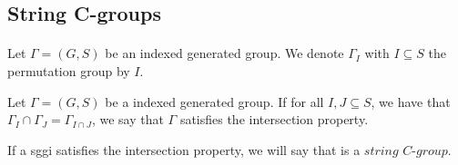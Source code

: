 \subsection{String C-groups}

\paragraph{}
Let $\Gamma = (G,S)$ be an indexed generated group. We denote $\Gamma_I$ with $I \subseteq S$ the permutation group by $I$.

\begin{definition}
  Let $\Gamma = (G,S)$ be a indexed generated group. If for all $I, J \subseteq S$, we have that $\Gamma_I \cap \Gamma_J = \Gamma_{I \cap J}$, we say that $\Gamma$ satisfies the intersection property.
\end{definition}

\begin{definition}
  If a sggi satisfies the intersection property, we will say that is a $\textit{string C-group}$.
\end{definition}

